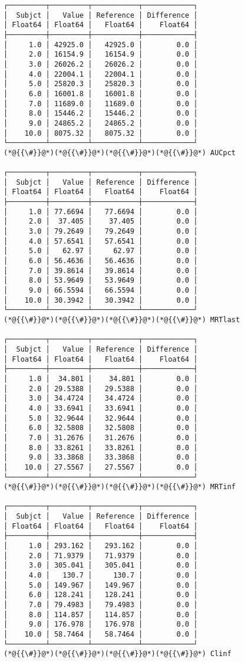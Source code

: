 \documentclass[12pt,a4paper]{article}
\begin{document}
\begin{lstlisting}
┌─────────┬─────────┬───────────┬────────────┐
│  Subjct │   Value │ Reference │ Difference │
│ Float64 │ Float64 │   Float64 │    Float64 │
├─────────┼─────────┼───────────┼────────────┤
│     1.0 │ 42925.0 │   42925.0 │        0.0 │
│     2.0 │ 16154.9 │   16154.9 │        0.0 │
│     3.0 │ 26026.2 │   26026.2 │        0.0 │
│     4.0 │ 22004.1 │   22004.1 │        0.0 │
│     5.0 │ 25820.3 │   25820.3 │        0.0 │
│     6.0 │ 16001.8 │   16001.8 │        0.0 │
│     7.0 │ 11689.0 │   11689.0 │        0.0 │
│     8.0 │ 15446.2 │   15446.2 │        0.0 │
│     9.0 │ 24865.2 │   24865.2 │        0.0 │
│    10.0 │ 8075.32 │   8075.32 │        0.0 │
└─────────┴─────────┴───────────┴────────────┘
(*@{{\#}}@*)(*@{{\#}}@*)(*@{{\#}}@*)(*@{{\#}}@*) AUCpct

┌─────────┬─────────┬───────────┬────────────┐
│  Subjct │   Value │ Reference │ Difference │
│ Float64 │ Float64 │   Float64 │    Float64 │
├─────────┼─────────┼───────────┼────────────┤
│     1.0 │ 77.6694 │   77.6694 │        0.0 │
│     2.0 │  37.405 │    37.405 │        0.0 │
│     3.0 │ 79.2649 │   79.2649 │        0.0 │
│     4.0 │ 57.6541 │   57.6541 │        0.0 │
│     5.0 │   62.97 │     62.97 │        0.0 │
│     6.0 │ 56.4636 │   56.4636 │        0.0 │
│     7.0 │ 39.8614 │   39.8614 │        0.0 │
│     8.0 │ 53.9649 │   53.9649 │        0.0 │
│     9.0 │ 66.5594 │   66.5594 │        0.0 │
│    10.0 │ 30.3942 │   30.3942 │        0.0 │
└─────────┴─────────┴───────────┴────────────┘
(*@{{\#}}@*)(*@{{\#}}@*)(*@{{\#}}@*)(*@{{\#}}@*) MRTlast

┌─────────┬─────────┬───────────┬────────────┐
│  Subjct │   Value │ Reference │ Difference │
│ Float64 │ Float64 │   Float64 │    Float64 │
├─────────┼─────────┼───────────┼────────────┤
│     1.0 │  34.801 │    34.801 │        0.0 │
│     2.0 │ 29.5388 │   29.5388 │        0.0 │
│     3.0 │ 34.4724 │   34.4724 │        0.0 │
│     4.0 │ 33.6941 │   33.6941 │        0.0 │
│     5.0 │ 32.9644 │   32.9644 │        0.0 │
│     6.0 │ 32.5808 │   32.5808 │        0.0 │
│     7.0 │ 31.2676 │   31.2676 │        0.0 │
│     8.0 │ 33.8261 │   33.8261 │        0.0 │
│     9.0 │ 33.3868 │   33.3868 │        0.0 │
│    10.0 │ 27.5567 │   27.5567 │        0.0 │
└─────────┴─────────┴───────────┴────────────┘
(*@{{\#}}@*)(*@{{\#}}@*)(*@{{\#}}@*)(*@{{\#}}@*) MRTinf

┌─────────┬─────────┬───────────┬────────────┐
│  Subjct │   Value │ Reference │ Difference │
│ Float64 │ Float64 │   Float64 │    Float64 │
├─────────┼─────────┼───────────┼────────────┤
│     1.0 │ 293.162 │   293.162 │        0.0 │
│     2.0 │ 71.9379 │   71.9379 │        0.0 │
│     3.0 │ 305.041 │   305.041 │        0.0 │
│     4.0 │   130.7 │     130.7 │        0.0 │
│     5.0 │ 149.967 │   149.967 │        0.0 │
│     6.0 │ 128.241 │   128.241 │        0.0 │
│     7.0 │ 79.4983 │   79.4983 │        0.0 │
│     8.0 │ 114.857 │   114.857 │        0.0 │
│     9.0 │ 176.978 │   176.978 │        0.0 │
│    10.0 │ 58.7464 │   58.7464 │        0.0 │
└─────────┴─────────┴───────────┴────────────┘
(*@{{\#}}@*)(*@{{\#}}@*)(*@{{\#}}@*)(*@{{\#}}@*) Clinf


\end{lstlisting}
\end{document}
